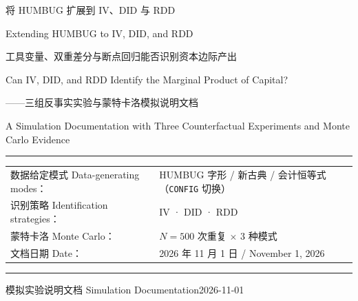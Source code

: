 \documentclass[12pt,a4paper]{ctexart}
\begin{document}
\begin{titlepage}
\centering
\vspace*{2.4cm}
{\heiti\fontsize{22pt}{32pt}\selectfont 将 HUMBUG 扩展到 IV、DID 与 RDD\par}
\vspace{0.35cm}
{\heiti\fontsize{15pt}{22pt}\selectfont Extending HUMBUG to IV, DID, and RDD\par}
\vspace{1.0cm}
{\heiti\fontsize{13pt}{20pt}\selectfont 工具变量、双重差分与断点回归能否识别资本边际产出\par}
\vspace{0.25cm}
{\heiti\fontsize{11.5pt}{17pt}\selectfont Can IV, DID, and RDD Identify the Marginal Product of Capital?\par}
\vspace{0.25cm}
{\heiti\fontsize{13pt}{20pt}\selectfont ——三组反事实实验与蒙特卡洛模拟说明文档\par}
\vspace{0.25cm}
{\heiti\fontsize{11.5pt}{17pt}\selectfont A Simulation Documentation with Three Counterfactual Experiments and Monte Carlo Evidence\par}
\vspace{1.8cm}
{\rule{\textwidth}{0.4pt}\par}
\vspace{0.6cm}
{\small
\begin{tabular}{@{}l@{\quad}l@{}}
数据给定模式 Data-generating modes： & HUMBUG 字形 / 新古典 / 会计恒等式（\texttt{CONFIG} 切换）\\
识别策略 Identification strategies：   & IV · DID · RDD\\
蒙特卡洛 Monte Carlo：                 & $N = 500$ 次重复 $\times$ 3 种模式\\
文档日期 Date：                        & 2026 年 11 月 1 日 / November 1, 2026\\
\end{tabular}\par}
\vspace{0.6cm}
{\rule{\textwidth}{0.4pt}\par}
\vfill
{\small 模拟实验说明文档 Simulation Documentation\hfill 2026-11-01\par}
\vspace*{0.8cm}
\end{titlepage}


\pagestyle{frontmatter}
\tableofcontents
\clearpage
\end{document}
